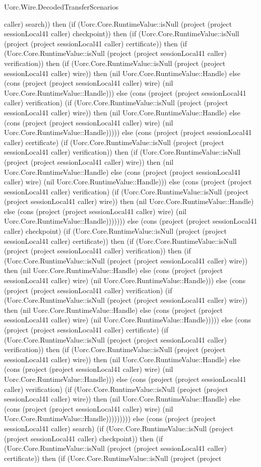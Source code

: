 \begin{lexlean}{Uorc.Wire.DecodedTransferScenarios}
\begin{semanticmodule}
{caller) search)) then (if (Uorc.Core.RuntimeValue::isNull (project (project sessionLocal41 caller) checkpoint)) then (if (Uorc.Core.RuntimeValue::isNull (project (project sessionLocal41 caller) certificate)) then (if (Uorc.Core.RuntimeValue::isNull (project (project sessionLocal41 caller) verification)) then (if (Uorc.Core.RuntimeValue::isNull (project (project sessionLocal41 caller) wire)) then (nil Uorc.Core.RuntimeValue::Handle) else (cons (project (project sessionLocal41 caller) wire) (nil Uorc.Core.RuntimeValue::Handle))) else (cons (project (project sessionLocal41 caller) verification) (if (Uorc.Core.RuntimeValue::isNull (project (project sessionLocal41 caller) wire)) then (nil Uorc.Core.RuntimeValue::Handle) else (cons (project (project sessionLocal41 caller) wire) (nil Uorc.Core.RuntimeValue::Handle))))) else (cons (project (project sessionLocal41 caller) certificate) (if (Uorc.Core.RuntimeValue::isNull (project (project sessionLocal41 caller) verification)) then (if (Uorc.Core.RuntimeValue::isNull (project (project sessionLocal41 caller) wire)) then (nil Uorc.Core.RuntimeValue::Handle) else (cons (project (project sessionLocal41 caller) wire) (nil Uorc.Core.RuntimeValue::Handle))) else (cons (project (project sessionLocal41 caller) verification) (if (Uorc.Core.RuntimeValue::isNull (project (project sessionLocal41 caller) wire)) then (nil Uorc.Core.RuntimeValue::Handle) else (cons (project (project sessionLocal41 caller) wire) (nil Uorc.Core.RuntimeValue::Handle))))))) else (cons (project (project sessionLocal41 caller) checkpoint) (if (Uorc.Core.RuntimeValue::isNull (project (project sessionLocal41 caller) certificate)) then (if (Uorc.Core.RuntimeValue::isNull (project (project sessionLocal41 caller) verification)) then (if (Uorc.Core.RuntimeValue::isNull (project (project sessionLocal41 caller) wire)) then (nil Uorc.Core.RuntimeValue::Handle) else (cons (project (project sessionLocal41 caller) wire) (nil Uorc.Core.RuntimeValue::Handle))) else (cons (project (project sessionLocal41 caller) verification) (if (Uorc.Core.RuntimeValue::isNull (project (project sessionLocal41 caller) wire)) then (nil Uorc.Core.RuntimeValue::Handle) else (cons (project (project sessionLocal41 caller) wire) (nil Uorc.Core.RuntimeValue::Handle))))) else (cons (project (project sessionLocal41 caller) certificate) (if (Uorc.Core.RuntimeValue::isNull (project (project sessionLocal41 caller) verification)) then (if (Uorc.Core.RuntimeValue::isNull (project (project sessionLocal41 caller) wire)) then (nil Uorc.Core.RuntimeValue::Handle) else (cons (project (project sessionLocal41 caller) wire) (nil Uorc.Core.RuntimeValue::Handle))) else (cons (project (project sessionLocal41 caller) verification) (if (Uorc.Core.RuntimeValue::isNull (project (project sessionLocal41 caller) wire)) then (nil Uorc.Core.RuntimeValue::Handle) else (cons (project (project sessionLocal41 caller) wire) (nil Uorc.Core.RuntimeValue::Handle))))))))) else (cons (project (project sessionLocal41 caller) search) (if (Uorc.Core.RuntimeValue::isNull (project (project sessionLocal41 caller) checkpoint)) then (if (Uorc.Core.RuntimeValue::isNull (project (project sessionLocal41 caller) certificate)) then (if (Uorc.Core.RuntimeValue::isNull (project (project }
\end{semanticmodule}
\end{lexlean}
